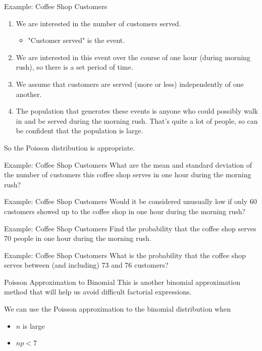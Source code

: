 \begin{frame}{Example: Coffee Shop Customers}
    \begin{enumerate}
        \item We are interested in the number of customers served.
        \begin{itemize}
            \item "Customer served" is the event.
        \end{itemize}
        \item We are interested in this event over the course of one hour (during morning rush), so there is a set period of time.
        \item We assume that customers are served (more or less) independently of one another.
        \item The population that generates these events is anyone who could possibly walk in and be served during the morning rush. That's quite a lot of people, so can be confident that the population is large.
    \end{enumerate}
    So the Poisson distribution is appropriate.
\end{frame}

\begin{frame}{Example: Coffee Shop Customers}
    What are the mean and standard deviation of the number of customers this coffee shop serves in one hour during the morning rush?
\end{frame}

\begin{frame}{Example: Coffee Shop Customers}
    Would it be considered unusually low if only 60 customers showed up to the coffee shop in one hour during the morning rush?
\end{frame}

\begin{frame}{Example: Coffee Shop Customers}
    Find the probability that the coffee shop serves 70 people in one hour during the morning rush.
\end{frame}

\begin{frame}{Example: Coffee Shop Customers}
    What is the probability that the coffee shop serves between (and including) 73 and 76 customers?
\end{frame}

\begin{frame}{Poisson Approximation to Binomial}
    This is another binomial approximation method that will help us avoid difficult factorial expressions.
    
    \vspace{12pt}We can use the Poisson approximation to the binomial distribution when
    \begin{itemize}
        \item $n$ is large
        \item $np < 7$
    \end{itemize}
\end{frame}

